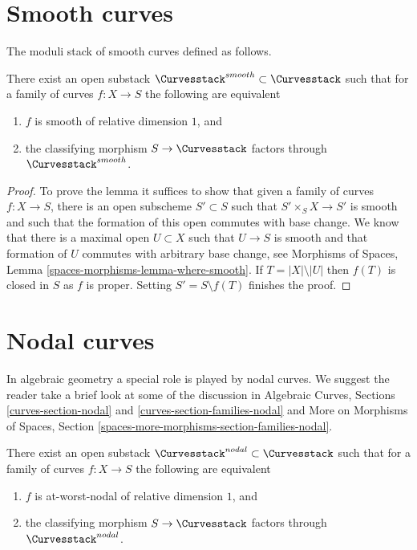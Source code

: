 \section{Smooth curves}
\label{section-smooth-curves}

\noindent
The moduli stack of smooth curves defined as follows.

\begin{lemma}
\label{lemma-smooth-part-curves}
There exist an open substack $\Curvesstack^{smooth} \subset \Curvesstack$
such that for a family of curves $f : X \to S$ the following are equivalent
\begin{enumerate}
\item $f$ is smooth of relative dimension $1$, and
\item the classifying morphism $S \to \Curvesstack$ factors
through $\Curvesstack^{smooth}$.
\end{enumerate}
\end{lemma}

\begin{proof}
To prove the lemma it suffices to show that given a family of curves
$f : X \to S$, there is an open subscheme $S' \subset S$
such that $S' \times_S X \to S'$ is smooth and such that the
formation of this open commutes with base change.
We know that there is a maximal open $U \subset X$ such
that $U \to S$ is smooth and that formation of $U$ commutes
with arbitrary base change, see
Morphisms of Spaces, Lemma \ref{spaces-morphisms-lemma-where-smooth}.
If $T = |X| \setminus |U|$ then $f(T)$ is closed in $S$
as $f$ is proper.
Setting $S' = S \setminus f(T)$ finishes the proof.
\end{proof}









\section{Nodal curves}
\label{section-nodal-curves}

\noindent
In algebraic geometry a special role is played by nodal curves.
We suggest the reader take a brief look at some of the discussion
in Algebraic Curves, Sections \ref{curves-section-nodal} and
\ref{curves-section-families-nodal}
and More on Morphisms of Spaces, Section
\ref{spaces-more-morphisms-section-families-nodal}.

\begin{lemma}
\label{lemma-nodal-part-curves}
There exist an open substack $\Curvesstack^{nodal} \subset \Curvesstack$
such that for a family of curves $f : X \to S$ the following are equivalent
\begin{enumerate}
\item $f$ is at-worst-nodal of relative dimension $1$, and
\item the classifying morphism $S \to \Curvesstack$ factors
through $\Curvesstack^{nodal}$.
\end{enumerate}
\end{lemma}

